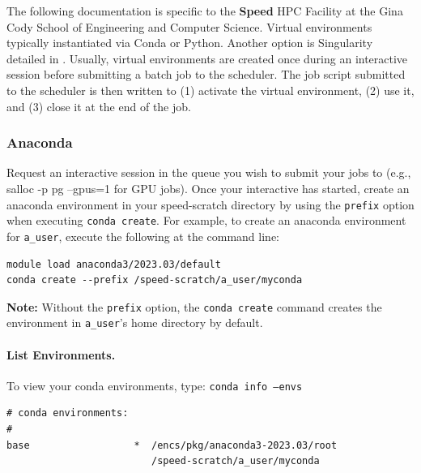 \documentclass{easychair}
\begin{document}
The following documentation is specific to the \textbf{Speed} HPC Facility at the
Gina Cody School of Engineering and Computer Science.
%
Virtual environments typically instantiated via Conda or Python.
Another option is Singularity detailed in .
%
Usually, virtual environments are created once during an interactive session before submitting
a batch job to the scheduler. The job script submitted to the scheduler is then written to 
(1) activate the virtual environment, (2) use it, and (3) close it at the end of the job.

\subsubsection{Anaconda}
\label{sect:conda-venv}

Request an interactive session in the queue you wish to submit your jobs to (e.g., salloc -p pg --gpus=1 for GPU jobs).
Once your interactive has started, create an anaconda environment in your speed-scratch directory by using 
the \texttt{\-\-prefix} option when executing \texttt{conda create}. For example, to create an anaconda environment for 
\texttt{a\_user}, execute the following at the command line:

\begin{verbatim}
module load anaconda3/2023.03/default
conda create --prefix /speed-scratch/a_user/myconda
\end{verbatim}

\vspace{10pt}
\noindent
\textbf{Note:} Without the \texttt{\-\-prefix} option, the \texttt{conda create} command creates the 
environment in \texttt{a\_user}'s home directory by default.
\vspace{10pt}

\paragraph{List Environments.}

To view your conda environments, type: \texttt{conda info --envs}

\begin{verbatim}
# conda environments:
#
base                  *  /encs/pkg/anaconda3-2023.03/root
                         /speed-scratch/a_user/myconda
\end{verbatim}      
\end{document}
